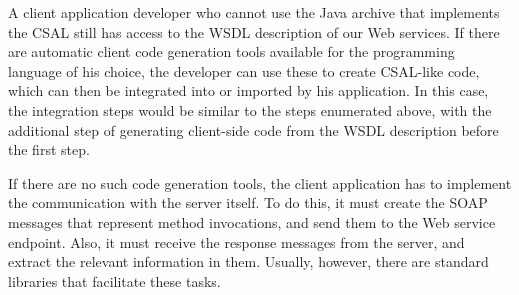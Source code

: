 A client application developer who cannot use the Java archive that
implements the CSAL still has access to the WSDL description of our
Web services. If there are automatic client code generation tools
available for the programming language of his choice, the developer
can use these to create CSAL-like code, which can then be integrated
into or imported by his application. In this case, the integration
steps would be similar to the steps enumerated above, with the
additional step of generating client-side code from the WSDL
description before the first step.

If there are no such code generation tools, the client application has
to implement the communication with the server itself. To do this, it
must create the SOAP messages that represent method invocations, and
send them to the Web service endpoint. Also, it must receive the
response messages from the server, and extract the relevant
information in them. Usually, however, there are standard libraries
that facilitate these tasks.



